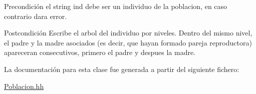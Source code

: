 \begin{DoxyPrecond}{Precondición}
el string ind debe ser un individuo de la poblacion, en caso contrario dara error. 
\end{DoxyPrecond}
\begin{DoxyPostcond}{Postcondición}
Escribe el arbol del individuo por niveles. Dentro del mismo nivel, el padre y la madre asociados (es decir, que hayan formado pareja reproductora) apareceran consecutivos, primero el padre y despues la madre. 
\end{DoxyPostcond}


La documentación para esta clase fue generada a partir del siguiente fichero\+:\begin{DoxyCompactItemize}
\item 
\hyperlink{_poblacion_8hh}{Poblacion.\+hh}\end{DoxyCompactItemize}
